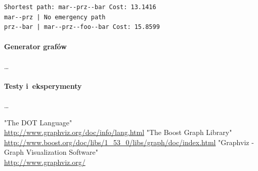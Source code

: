 \documentclass[a4paper, 12pt]{article}
\begin{document}
\begin{verbatim}
Shortest path: mar--prz--bar Cost: 13.1416
mar--prz | No emergency path
prz--bar | mar--prz--foo--bar Cost: 15.8599
\end{verbatim}

\paragraph{Generator grafów}\label{generator}
\dots

\paragraph{Testy i~eksperymenty}
\dots

\begin{thebibliography}{}
 "The DOT Language" \\ \url{http://www.graphviz.org/doc/info/lang.html}
 "The Boost Graph Library" \\ \url{http://www.boost.org/doc/libs/1_53_0/libs/graph/doc/index.html}
 "Graphviz - Graph Visualization Software" \\ \url{http://www.graphviz.org/}
\end{thebibliography}
\end{document}
